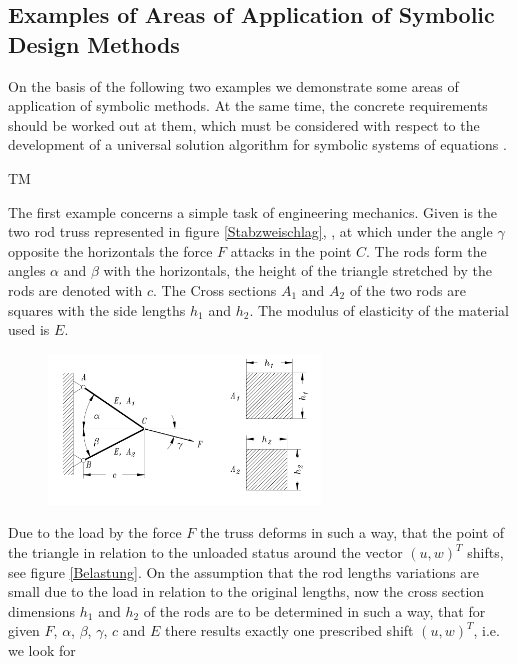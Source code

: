 \subsection[Examples of Areas of Application of Symbolic Design Methods]{Examples of Areas of Application of Symbolic Design Methods}

On the basis of the following two examples we demonstrate some areas of application of symbolic methods. At the same time, the concrete requirements should be worked out at them, which must be considered with respect to the development of  a universal solution algorithm for symbolic systems of equations .


\begin{example}{TM}

The first example concerns  a simple task  of engineering mechanics. Given is the two rod truss represented in figure \ref{Stabzweischlag}, \cite[S.~112]{Brommundt}, at which under the angle $\gamma$ opposite the horizontals the force $F$ attacks in the point $C$. The rods form the angles $\alpha$ and $\beta$ with the horizontals, the height of the triangle stretched by the rods are denoted with $c$. The  Cross sections  $A_1$ and $A_2$  of the two rods are squares with the side lengths $h_1$ and $h_2$. The modulus of elasticity of the  material used is $E$. 

\begin {figure} [htbp]
\begin {center}
\includegraphics[height=4cm]{zweischl.png}
\caption {}%
\end {center}
\end {figure}
Due to the load by the force $F$  the truss deforms in such a way, that the point of the triangle in relation to the unloaded status around the vector $(u,w)^T$ shifts, see figure  \ref{Belastung}. On the assumption that the rod lengths variations are small due to the load in relation to the original lengths, now  the cross section dimensions $h_1$ and $h_2$ of the rods are to be determined  in such a way, that for given $F$, $\alpha$, $\beta$, $\gamma$, $c$ and $E$ there results exactly one prescribed shift $(u,w)^T$, i.e. we look for


\end{example}
